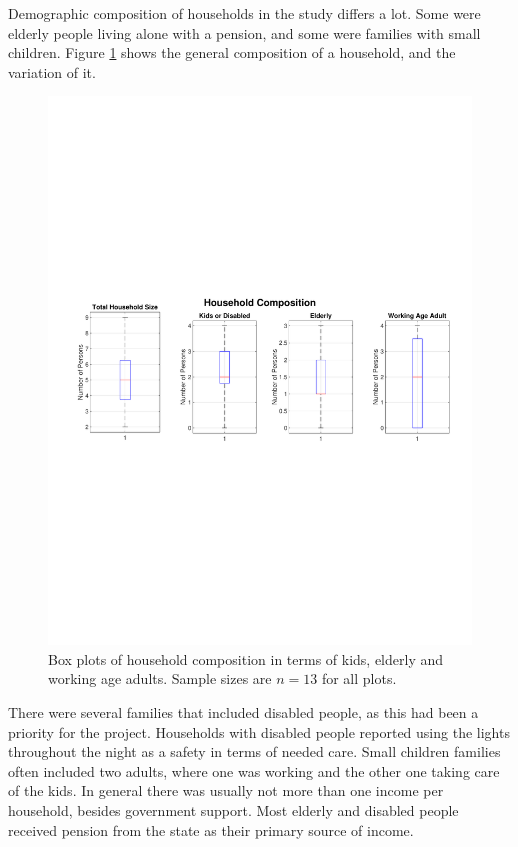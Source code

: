 Demographic composition of households in the study differs a lot. Some were elderly people living alone with a pension, and some were families with small children. Figure \ref{res:fig:HouseholdComposition} shows the general composition of a household, and the variation of it. 
\begin{figure}[H]
    \centering
    \includegraphics[width=\linewidth]{photos/HouseholdComposition.pdf}
    \caption{Box plots of household composition in terms of kids, elderly and working age adults. Sample sizes are $n=13$ for all plots.}
    \label{res:fig:HouseholdComposition}
\end{figure}
There were several families that included disabled people, as this had been a priority for the project. Households with disabled people reported using the lights throughout the night as a safety in terms of needed care. Small children families often included two adults, where one was working and the other one taking care of the kids. In general there was usually not more than one income per household, besides government support. Most elderly and disabled people received pension from the state as their primary source of income. 

